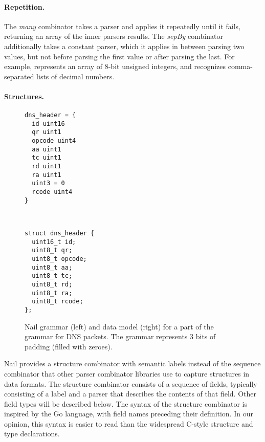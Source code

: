 \paragraph{Repetition.}

The \emph{many} combinator takes a parser and applies it repeatedly
until it fails, returning an array of the inner parsers results. The
\emph{sepBy} combinator
additionally takes a constant parser, which it applies in between parsing
two values, but not before parsing the first value or after parsing the
last.
For example,  represents an array of 8-bit unsigned
integers, and  recognizes
comma-separated lists of decimal numbers.

\paragraph{Structures.}

\begin{figure}[tb]
\smaller[0.5]
\begin{minipage}{0.45\columnwidth}
\begin{verbatim}
dns_header = {
  id uint16
  qr uint1
  opcode uint4
  aa uint1 
  tc uint1
  rd uint1
  ra uint1
  uint3 = 0
  rcode uint4
}
\end{verbatim} 
\end{minipage}
~
\begin{minipage}{0.45\columnwidth}
\begin{verbatim}
struct dns_header {
  uint16_t id;
  uint8_t qr;
  uint8_t opcode;
  uint8_t aa;
  uint8_t tc;
  uint8_t rd;
  uint8_t ra;
  uint8_t rcode;
};
\end{verbatim} 
\end{minipage}

\caption{Nail grammar (left) and data model (right) for a part of the
grammar for DNS packets.  The  grammar represents
3 bits of padding (filled with zeroes).}
\label{fig:dns-struct}
\end{figure}


Nail provides a structure combinator with semantic labels instead of the sequence combinator that
other parser combinator libraries use to capture structures in data formats. 
The structure combinator consists of a sequence of fields, typically consisting of a label and a
parser that describes the contents of that field. Other field types will be described below.
 The syntax of the structure combinator is inspired by the Go language\cite{golang}, with field names preceding their definition.
In our opinion, this syntax is easier to read than the widespread C-style structure and type
declarations.

